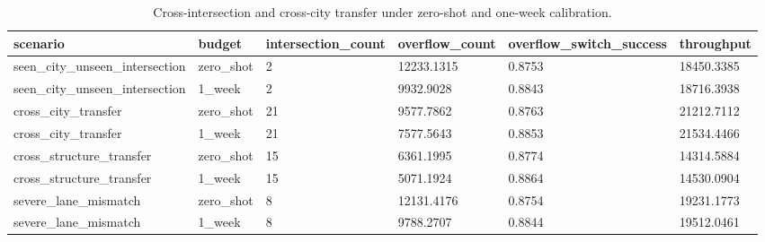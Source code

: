 \begin{table}[t]
\centering
\small
\begin{tabular}{llllll}
\toprule
scenario & budget & intersection\_count & overflow\_count & overflow\_switch\_success & throughput \\
\midrule
seen\_city\_unseen\_intersection & zero\_shot & 2 & 12233.1315 & 0.8753 & 18450.3385 \\
seen\_city\_unseen\_intersection & 1\_week & 2 & 9932.9028 & 0.8843 & 18716.3938 \\
cross\_city\_transfer & zero\_shot & 21 & 9577.7862 & 0.8763 & 21212.7112 \\
cross\_city\_transfer & 1\_week & 21 & 7577.5643 & 0.8853 & 21534.4466 \\
cross\_structure\_transfer & zero\_shot & 15 & 6361.1995 & 0.8774 & 14314.5884 \\
cross\_structure\_transfer & 1\_week & 15 & 5071.1924 & 0.8864 & 14530.0904 \\
severe\_lane\_mismatch & zero\_shot & 8 & 12131.4176 & 0.8754 & 19231.1773 \\
severe\_lane\_mismatch & 1\_week & 8 & 9788.2707 & 0.8844 & 19512.0461 \\
\bottomrule
\end{tabular}
\caption{Cross-intersection and cross-city transfer under zero-shot and one-week calibration.}
\label{tab:s2r-cross-generalization}
\end{table}
